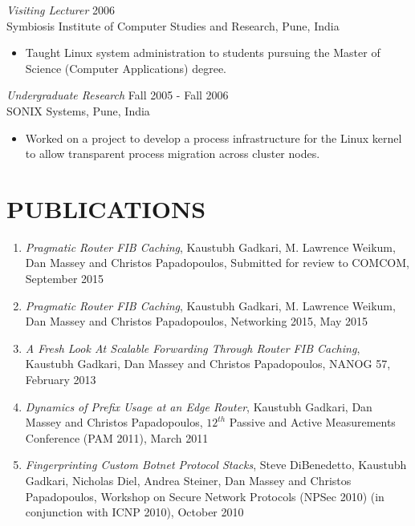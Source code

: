 \documentclass[line,margin]{res}
\begin{document}
\begin{resume}
    {\sl Visiting Lecturer} \hfill 2006\\
        Symbiosis Institute of Computer Studies and Research, Pune, India
        \begin{itemize} \itemsep -2pt
            \item Taught Linux system administration to students pursuing the Master
            of Science (Computer Applications) degree.
        \end{itemize}

    {\sl Undergraduate Research} \hfill Fall 2005 - Fall 2006\\
        SONIX Systems, Pune, India
        \begin{itemize} \itemsep -2pt
            \item Worked on a project to develop a process infrastructure for the Linux kernel to allow
            transparent process migration across cluster nodes.
        \end{itemize}

\section{PUBLICATIONS}
            \begin{enumerate}
              \item {\sl Pragmatic Router FIB Caching}, Kaustubh Gadkari, M. Lawrence Weikum, Dan Massey and
				  Christos Papadopoulos, Submitted for review to COMCOM, September 2015
              \item {\sl Pragmatic Router FIB Caching}, Kaustubh Gadkari, M. Lawrence Weikum, Dan Massey and
				  Christos Papadopoulos, Networking 2015, May 2015

		  	\item {\sl A Fresh Look At Scalable Forwarding Through Router FIB Caching}, Kaustubh Gadkari, Dan Massey and
              Christos Papadopoulos, NANOG 57, February 2013

              \item {\sl Dynamics of Prefix Usage at an Edge Router}, Kaustubh Gadkari, Dan Massey and Christos Papadopoulos,
              ${12^{th}}$ Passive and Active Measurements Conference (PAM 2011), March 2011

         	  \item {\sl Fingerprinting Custom Botnet Protocol Stacks}, Steve DiBenedetto, Kaustubh Gadkari, Nicholas Diel,
              Andrea Steiner, Dan Massey and Christos Papadopoulos, Workshop on Secure Network Protocols (NPSec 2010)
              (in conjunction with ICNP 2010), October 2010


\end{enumerate}
\end{resume}
\end{document}
